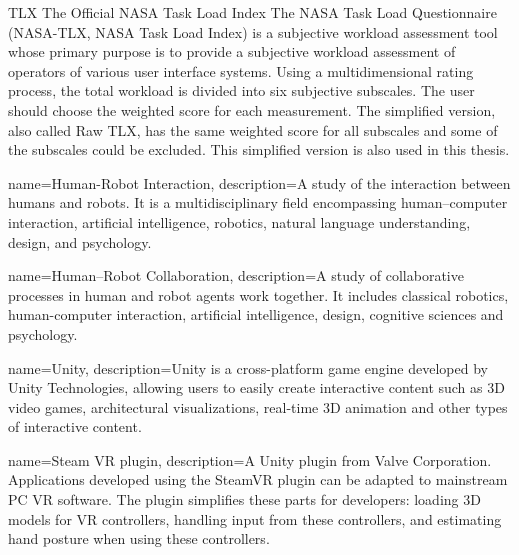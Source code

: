 {TLX}            %
{The Official NASA Task Load Index}  %
{\glsresetall The NASA Task Load Questionnaire (NASA-TLX, NASA Task Load Index) is a subjective workload assessment tool whose primary purpose is to provide a subjective workload assessment of operators of various user interface systems. Using a multidimensional rating process, the total workload is divided into six subjective subscales. The user should choose the weighted score for each measurement. The simplified version, also called Raw TLX, has the same weighted score for all subscales and some of the subscales could be excluded. This simplified version is also used in this thesis.
}%



{name={Human-Robot Interaction},
	description={\glsresetall A study of the interaction between humans and robots. It is a multidisciplinary field encompassing human–computer interaction, artificial intelligence, robotics, natural language understanding, design, and psychology.}
}


{name={Human–Robot Collaboration},
	description={\glsresetall A study of collaborative processes in human and robot agents work together. It includes classical robotics, human-computer interaction, artificial intelligence, design, cognitive sciences and psychology.}
}



{name={Unity},
	description={\glsresetall Unity is a cross-platform game engine developed by Unity Technologies,  allowing users to easily create interactive content such as 3D video games, architectural visualizations, real-time 3D animation and other types of interactive content.}
}

{name={Steam VR plugin},
	description={\glsresetall A Unity plugin from Valve Corporation. Applications developed using the SteamVR plugin can be adapted to mainstream PC VR software. The plugin simplifies these parts for developers: loading 3D models for VR controllers, handling input from these controllers, and estimating hand posture when using these controllers.}
}

